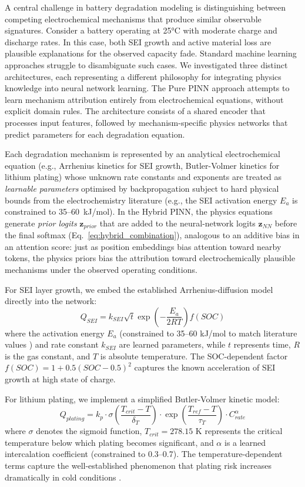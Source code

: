 \documentclass[5p,times,authoryear]{elsarticle}
\begin{document}
A central challenge in battery degradation modeling is distinguishing between competing electrochemical mechanisms that produce similar observable signatures. Consider a battery operating at 25°C with moderate charge and discharge rates. In this case, both SEI growth and active material loss are plausible explanations for the observed capacity fade. Standard machine learning approaches struggle to disambiguate such cases. We investigated three distinct architectures, each representing a different philosophy for integrating physics knowledge into neural network learning. The Pure PINN approach attempts to learn mechanism attribution entirely from electrochemical equations, without explicit domain rules. The architecture consists of a shared encoder that processes input features, followed by mechanism-specific physics networks that predict parameters for each degradation equation.

Each degradation mechanism is represented by an analytical electrochemical equation (e.g., Arrhenius kinetics for SEI growth, Butler-Volmer kinetics for lithium plating) whose unknown rate constants and exponents are treated as \emph{learnable parameters} optimised by backpropagation subject to hard physical bounds from the electrochemistry literature (e.g., the SEI activation energy $E_a$ is constrained to 35--60~kJ/mol). In the Hybrid PINN, the physics equations generate \emph{prior logits} $\mathbf{z}_{prior}$ that are added to the neural-network logits $\mathbf{z}_{NN}$ before the final softmax (Eq.~\ref{eq:hybrid_combination}), analogous to an additive bias in an attention score: just as position embeddings bias attention toward nearby tokens, the physics priors bias the attribution toward electrochemically plausible mechanisms under the observed operating conditions.

For SEI layer growth, we embed the established Arrhenius-diffusion model directly into the network:
\begin{equation}
Q_{SEI} = k_{SEI} \sqrt{t} \exp\left(-\frac{E_a}{2RT}\right) f(SOC)
\label{eq:sei_physics}
\end{equation}
where the activation energy $E_a$ (constrained to 35--60 kJ/mol to match literature values \citep{broussely2005main}) and rate constant $k_{SEI}$ are learned parameters, while $t$ represents time, $R$ is the gas constant, and $T$ is absolute temperature. The SOC-dependent factor $f(SOC) = 1 + 0.5(SOC - 0.5)^2$ captures the known acceleration of SEI growth at high state of charge.

For lithium plating, we implement a simplified Butler-Volmer kinetic model:
\begin{equation}
Q_{plating} = k_p \cdot \sigma\left(\frac{T_{crit} - T}{\delta_T}\right) \cdot \exp\left(\frac{T_{ref} - T}{\tau_T}\right) \cdot C_{rate}^\alpha
\label{eq:plating_physics}
\end{equation}
where $\sigma$ denotes the sigmoid function, $T_{crit} = 278.15$ K represents the critical temperature below which plating becomes significant, and $\alpha$ is a learned intercalation coefficient (constrained to 0.3--0.7). The temperature-dependent terms capture the well-established phenomenon that plating risk increases dramatically in cold conditions \citep{waldmann2014temperature}.
\end{document}
